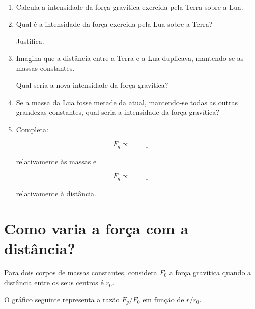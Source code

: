 \documentclass[11pt,a4paper]{article}
\newcommand{\resposta}[1][1]{
	\vspace{#1cm}
}
\begin{document}
	\begin{enumerate}[label=\textbf{\arabic*.},resume]
		
		\item Calcula a intensidade da força gravítica exercida pela Terra sobre
		a Lua.
		
		\resposta[1.5]
		
		\item Qual é a intensidade da força exercida pela Lua sobre a Terra?
		
		Justifica.
		
		\resposta[0.8]
		
		\item Imagina que a distância entre a Terra e a Lua duplicava, mantendo-se
		as massas constantes.
		
		Qual seria a nova intensidade da força gravítica?
		
		\resposta[1.0]
		
		\item Se a massa da Lua fosse metade da atual, mantendo-se todas as outras
		grandezas constantes, qual seria a intensidade da força gravítica?
		
		\resposta[1.0]
		
		\item Completa:
		
		\[
		F_g\propto \underline{\hspace{2cm}}
		\]
		
		relativamente às massas e
		
		\[
		F_g\propto \underline{\hspace{2cm}}
		\]
		
		relativamente à distância.
		
	\end{enumerate}
	
	\section{Como varia a força com a distância?}
	
	Para dois corpos de massas constantes, considera $F_0$ a força gravítica
	quando a distância entre os seus centros é $r_0$.
	
	O gráfico seguinte representa a razão $F_g/F_0$ em função de $r/r_0$.
	
\end{document}
